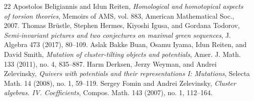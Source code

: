 \begin{thebibliography}{22}
 Apostolos Beligiannis and Idun Reiten, \emph{Homological and homotopical aspects of torsion theories}, Memoirs of AMS, vol. 883, American Mathematical Soc., 2007.
 Thomas Br\"ustle, Stephen Hermes, Kiyoshi Igusa, and Gordana Todorov, \emph{Semi-invariant pictures and two conjectures on maximal green sequences}, J. Algebra 473 (2017), 80--109.
 Aslak Bakke Buan, Osamu Iyama, Idun Reiten, and David Smith, \emph{Mutation of cluster-tilting objects and potentials}, Amer. J. Math. 133 (2011), no. 4, 835--887.
 Harm Derksen, Jerzy Weyman, and Andrei Zelevinsky, \emph{Quivers with potentials and their representations I: Mutations}, Selecta Math. 14 (2008), no. 1, 59--119.
 Sergey Fomin and Andrei Zelevinsky, \emph{Cluster algebras. IV. Coefficients}, Compos. Math. 143 (2007), no. 1, 112--164.
\end{thebibliography}
